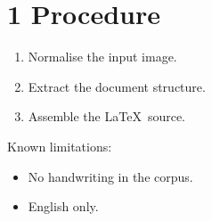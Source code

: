 \documentclass{article}
\begin{document}
\section*{1 \quad Procedure}

\begin{enumerate}
    \item Normalise the input image.
    \item Extract the document structure.
    \item Assemble the \LaTeX\ source.
\end{enumerate}

Known limitations:

\begin{itemize}
    \item No handwriting in the corpus.
    \item English only.
\end{itemize}
\end{document}

